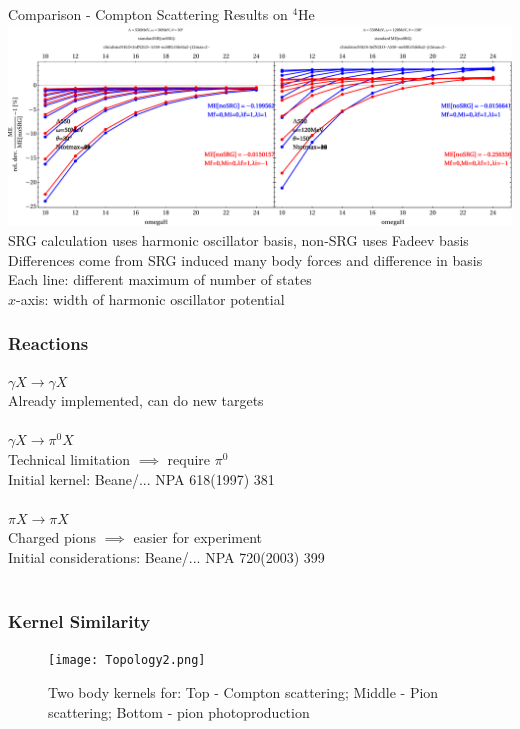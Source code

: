\documentclass{beamer}
\newcommand{\HeF}{{}^{4} \mathrm{He}}
\begin{document}
\begin{frame}{Comparison - Compton Scattering Results on $\HeF$}
\includegraphics[scale=0.28]{SRG-Converge-Double.pdf}
SRG calculation uses harmonic oscillator basis, non-SRG uses Fadeev basis\\
Differences come from SRG induced many body forces and difference in basis\\
Each line: different maximum of number of states\\
$x$-axis: width of harmonic oscillator potential 
\end{frame}







\begin{frame}\frametitle{Reactions}
$\gamma X \to \gamma X$\\
Already implemented, can do new targets\\~\\

$\gamma X \to \pi^0 X$\\
Technical limitation $\implies$ require $\pi^0$\\
Initial kernel: Beane/... NPA 618(1997) 381\\
~\\
$\pi X \to \pi X$\\ Charged pions $\implies$ easier for experiment\\
Initial considerations: Beane/... NPA 720(2003) 399\\~\\
\end{frame}



\begin{frame}\frametitle{Kernel Similarity}
\begin{center}
\begin{figure}
\texttt{[image: Topology2.png]}

\caption{Two body kernels for: Top - Compton scattering; Middle - Pion scattering; Bottom - pion photoproduction}
\end{figure}
\end{center}
\end{frame}
\end{document}
